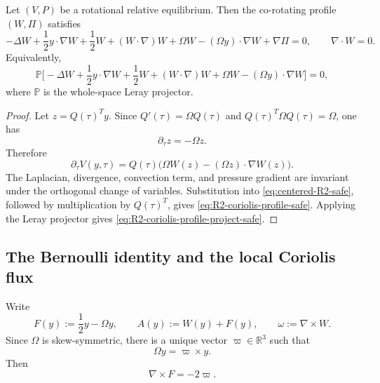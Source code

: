 \begin{lemma}
\label{lem:co-rotating-equation-safe}
Let \((V,P)\) be a rotational relative equilibrium.  Then the co-rotating
profile \((W,\Pi)\) satisfies
\begin{equation}\label{eq:R2-coriolis-profile-safe}
   -\Delta W+\frac12 y\cdot\nabla W+\frac12 W
   +(W\cdot\nabla)W
   +\Omega W-(\Omega y)\cdot\nabla W
   +\nabla\Pi=0,
   \qquad \nabla\cdot W=0 .
\end{equation}
Equivalently,
\begin{equation}\label{eq:R2-coriolis-profile-project-safe}
   \mathbb P\Big[
   -\Delta W+\frac12 y\cdot\nabla W+\frac12 W
   +(W\cdot\nabla)W
   +\Omega W-(\Omega y)\cdot\nabla W
   \Big]=0,
\end{equation}
where \(\mathbb P\) is the whole-space Leray projector.
\end{lemma}

\begin{proof}
Let \(z=Q(\tau)^Ty\).  Since \(Q'(\tau)=\Omega Q(\tau)\) and
\(Q(\tau)^T\Omega Q(\tau)=\Omega\), one has
\[
   \partial_\tau z=-\Omega z.
\]
Therefore
\[
   \partial_\tau V(y,\tau)
   =Q(\tau)\Big(\Omega W(z)-(\Omega z)\cdot\nabla W(z)\Big).
\]
The Laplacian, divergence, convection term, and pressure gradient are invariant
under the orthogonal change of variables.  Substitution into
\eqref{eq:centered-R2-safe}, followed by multiplication by \(Q(\tau)^T\), gives
\eqref{eq:R2-coriolis-profile-safe}.  Applying the Leray projector gives
\eqref{eq:R2-coriolis-profile-project-safe}.
\end{proof}

\subsection{The Bernoulli identity and the local Coriolis flux}

Write
\begin{equation}\label{eq:R2-F-def}
   F(y):=\frac12y-\Omega y,
   \qquad
   A(y):=W(y)+F(y),
   \qquad
   \omega:=\nabla\times W .
\end{equation}
Since \(\Omega\) is skew-symmetric, there is a unique vector
\(\varpi\in\mathbb R^3\) such that
\begin{equation}\label{eq:R2-Omega-vector}
   \Omega y=\varpi\times y .
\end{equation}
Then
\begin{equation}\label{eq:R2-curlF}
   \nabla\times F=-2\varpi .
\end{equation}

